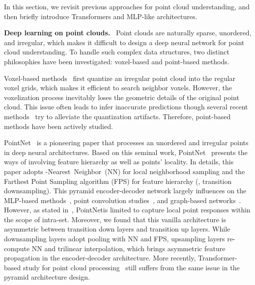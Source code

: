 In this section, we revisit previous approaches for point cloud understanding, and then briefly introduce Transformers and MLP-like architectures.

\noindent \textbf{Deep learning on point clouds.} \
Point clouds are naturally sparse, unordered, and irregular, which makes it difficult to design a deep neural network for point cloud understanding. To handle such complex data structures, two distinct philosophies have been investigated: voxel-based and point-based methods.

Voxel-based methods~\cite{lee2021putting,mink,3DSemanticSegmentationWithSubmanifoldSparseConvNet,maturana2015voxnet,su2018splatnet,zhou2018voxelnet} first quantize an irregular point cloud into the regular voxel grids, which makes it efficient to search neighbor voxels. 
However, the voxelization process inevitably loses the geometric details of the original point cloud. This issue often leads to infer inaccurate predictions though several recent methods~\cite{liu2019point,tang2020searching,zhang2020deep} try to alleviate the quantization artifacts. Therefore, point-based methods have been actively studied.


PointNet~\cite{pointnet} is a pioneering paper that processes an unordered and irregular points in deep neural architectures. Based on this seminal work, PointNet\plusplus~\cite{pointnet++} presents the ways of involving feature hierarchy as well as points' locality. In details, this paper adopts -Nearest~Neighbor~(NN) for local neighborhood sampling and the Farthest Point Sampling algorithm (FPS) for feature hierarchy (\eg, transition downsampling). 
This pyramid encoder-decoder network largely influences on the MLP-based methods~\cite{qian2021assanet,zhao2019pointweb,jiang2019hierarchical,liu2019densepoint,hu2020randla,klokov2017escape,li2018so,huang2018recurrent,xu2020geometry,yang2020cn}, 
point convolution studies~\cite{komarichev2019cnn,li2018pointcnn,lin2020fpconv,liu2019relation,interpconv,wu2019pointconv,xu2021paconv}, and graph-based networks~\cite{point-graph-00,point-graph-01,edgeconv,graph-attention,point-graph-03}. 
However, as stated in~\Tref{table:compare}, PointNet\plusplus is limited to capture local point responses within the scope of intra-set. Moreover, we found that this vanilla architecture is asymmetric between transition down layers and transition up layers. While downsampling layers adopt pooling with NN and FPS, upsampling layers re-compute NN and trilinear interpolation, which brings asymmetric feature propagation in the encoder-decoder architecture. More recently, Transformer-based study for point cloud processing~\cite{point-transformer} still suffers from the same issue in the pyramid architecture design. 





